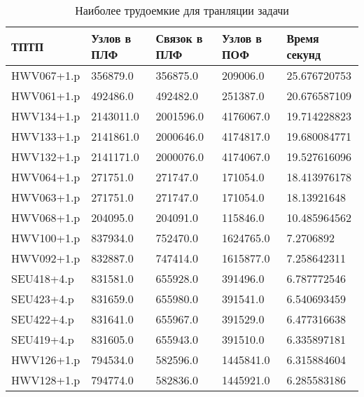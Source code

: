 \documentclass[a4paper]{jctart15b}
\begin{document}
\begin{table}[htbp]
	\caption{Наиболее трудоемкие для транляции задачи}\vspace*{2mm}
	\begin{tabular}{|l|l|l|l|l|}
		\hline
		\textbf{ТПТП} & \textbf{Узлов в ПЛФ} & \textbf{Связок в ПЛФ} & \textbf{Узлов в ПОФ} & \textbf{Время секунд} \\
		\hline
		HWV067+1.p & 356879.0 & 356875.0 & 209006.0 & 25.676720753 \\
		\hline
		HWV061+1.p & 492486.0 & 492482.0 & 251387.0 & 20.676587109 \\
		\hline
		HWV134+1.p & 2143011.0 & 2001596.0 & 4176067.0 & 19.714228823 \\
		\hline
		HWV133+1.p & 2141861.0 & 2000646.0 & 4174817.0 & 19.680084771 \\
		\hline
		HWV132+1.p & 2141171.0 & 2000076.0 & 4174067.0 & 19.527616096 \\
		\hline
		HWV064+1.p & 271751.0 & 271747.0 & 171054.0 & 18.413976178 \\
		\hline
		HWV063+1.p & 271751.0 & 271747.0 & 171054.0 & 18.13921648 \\
		\hline
		HWV068+1.p & 204095.0 & 204091.0 & 115846.0 & 10.485964562 \\
		\hline
		HWV100+1.p & 837934.0 & 752470.0 & 1624765.0 & 7.2706892 \\
		\hline
		HWV092+1.p & 832887.0 & 747414.0 & 1615877.0 & 7.258642311 \\
		\hline
		SEU418+4.p & 831581.0 & 655928.0 & 391496.0 & 6.787772546 \\
		\hline
		SEU423+4.p & 831659.0 & 655980.0 & 391541.0 & 6.540693459 \\
		\hline
		SEU422+4.p & 831641.0 & 655967.0 & 391529.0 & 6.477316638 \\
		\hline
		SEU419+4.p & 831605.0 & 655943.0 & 391510.0 & 6.335897181 \\
		\hline
		HWV126+1.p & 794534.0 & 582596.0 & 1445841.0 & 6.315884604 \\
		\hline
		HWV128+1.p & 794774.0 & 582836.0 & 1445921.0 & 6.285583186 \\
		\hline
		
	\end{tabular}
\end{table}

\end{document}
